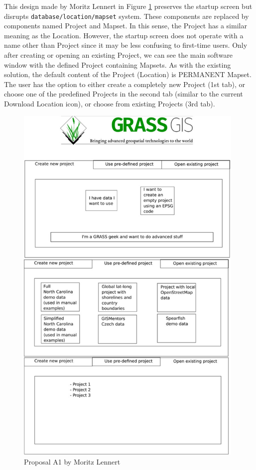 \documentclass[a4paper,10pt,twoside]{article}
\begin{document}
This design made by Moritz Lennert in Figure \ref{fig:proposalA1} preserves the startup screen but disrupts \texttt{database/location/mapset} system. These components are replaced by components named Project and Mapset. In this sense, the Project has a similar meaning as the Location. However, the startup screen does not operate with a name other than Project since it may be less confusing to first-time users. Only after creating or opening an existing Project, we can see the main software window with the defined Project containing Mapsets. As with the existing solution, the default content of the Project (Location) is PERMANENT Mapset. The user has the option to either create a completely new Project (1st tab), or choose one of the predefined Projects in the second tab (similar to the current Download Location icon), or choose from existing Projects (3rd tab).

\vspace{0.3cm}
\begin{figure}[hbt!] 
\begin{center}
\includegraphics[width=11cm]{pictures/proposalA1.png} 
\caption[Proposal A1 by Moritz Lennert]{Proposal A1 by Moritz Lennert}
\label{fig:proposalA1}
\end{center}
\end{figure}
\end{document}
